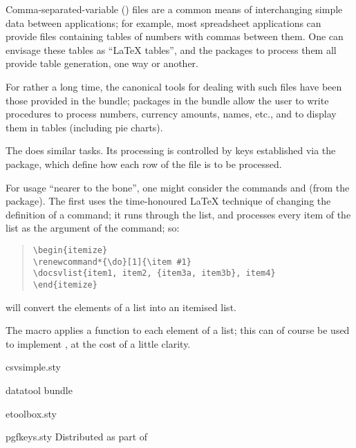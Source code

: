 
Comma-separated-variable () files are a common means of
interchanging simple data between applications; for example, most
spreadsheet applications can provide files containing tables of
numbers with commas between them.  One can envisage these tables as
``\LaTeX{} tables'', and the packages to process them all provide
table generation, one way or another.

For rather a long time, the canonical tools for dealing with such
files have been those provided in the  bundle;
packages in the bundle allow the user to write procedures to process
numbers, currency amounts, names, etc., and to display them in tables
(including pie charts).

The  does similar tasks.  Its processing is
controlled by keys established via the  package,
which define how each row of the  file is to be processed.

For usage ``nearer to the bone'', one might consider the commands
 and  (from the 
package).  The first uses the time-honoured \LaTeX{} technique of
changing the definition of a  command; it runs through the
list, and processes every item of the list as the argument of the
 command; so:
\begin{quote}
\begin{verbatim}
\begin{itemize}
\renewcommand*{\do}[1]{\item #1}
\docsvlist{item1, item2, {item3a, item3b}, item4}
\end{itemize}
\end{verbatim}
\end{quote}
will convert the elements of a  list into an itemised list.

The macro  applies a function to each element of a
 list; this can of course be used to implement
, at the cost of a little clarity.
\begin{ctanrefs}
\item[csvsimple.sty]
\item[datatool \nothtml{\rmfamily}bundle]
\item[etoolbox.sty]
\item[pgfkeys.sty]Distributed as part of 
\end{ctanrefs}
